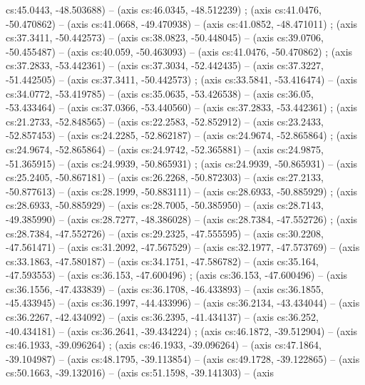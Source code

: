   cs:45.0443, -48.503688) -- (axis cs:46.0345, -48.512239)
  ;  (axis cs:41.0476, -50.470862) -- (axis
  cs:41.0668, -49.470938) -- (axis cs:41.0852, -48.471011)
  ;  (axis cs:37.3411, -50.442573) -- (axis
  cs:38.0823, -50.448045) -- (axis cs:39.0706, -50.455487) -- (axis cs:40.059,
  -50.463093) -- (axis cs:41.0476, -50.470862) ; 
  (axis cs:37.2833, -53.442361) -- (axis cs:37.3034, -52.442435) -- (axis
  cs:37.3227, -51.442505) -- (axis cs:37.3411, -50.442573)
  ;  (axis cs:33.5841, -53.416474) -- (axis
  cs:34.0772, -53.419785) -- (axis cs:35.0635, -53.426538) -- (axis cs:36.05,
  -53.433464) -- (axis cs:37.0366, -53.440560) -- (axis cs:37.2833,
  -53.442361) ;  (axis cs:21.2733, -52.848565) --
  (axis cs:22.2583, -52.852912) -- (axis cs:23.2433, -52.857453) -- (axis
  cs:24.2285, -52.862187) -- (axis cs:24.9674, -52.865864)
  ;  (axis cs:24.9674, -52.865864) -- (axis
  cs:24.9742, -52.365881) -- (axis cs:24.9875, -51.365915) -- (axis
  cs:24.9939, -50.865931) ;  (axis cs:24.9939,
  -50.865931) -- (axis cs:25.2405, -50.867181) -- (axis cs:26.2268,
  -50.872303) -- (axis cs:27.2133, -50.877613) -- (axis cs:28.1999,
  -50.883111) -- (axis cs:28.6933, -50.885929) ; 
  (axis cs:28.6933, -50.885929) -- (axis cs:28.7005, -50.385950) -- (axis
  cs:28.7143, -49.385990) -- (axis cs:28.7277, -48.386028) -- (axis
  cs:28.7384, -47.552726) ;  (axis cs:28.7384,
  -47.552726) -- (axis cs:29.2325, -47.555595) -- (axis cs:30.2208,
  -47.561471) -- (axis cs:31.2092, -47.567529) -- (axis cs:32.1977,
  -47.573769) -- (axis cs:33.1863, -47.580187) -- (axis cs:34.1751,
  -47.586782) -- (axis cs:35.164, -47.593553) -- (axis cs:36.153, -47.600496)
  ;  (axis cs:36.153, -47.600496) -- (axis
  cs:36.1556, -47.433839) -- (axis cs:36.1708, -46.433893) -- (axis
  cs:36.1855, -45.433945) -- (axis cs:36.1997, -44.433996) -- (axis
  cs:36.2134, -43.434044) -- (axis cs:36.2267, -42.434092) -- (axis
  cs:36.2395, -41.434137) -- (axis cs:36.252, -40.434181) -- (axis cs:36.2641,
  -39.434224) ;  (axis cs:46.1872, -39.512904) --
  (axis cs:46.1933, -39.096264) ;  (axis
  cs:46.1933, -39.096264) -- (axis cs:47.1864, -39.104987) -- (axis
  cs:48.1795, -39.113854) -- (axis cs:49.1728, -39.122865) -- (axis
  cs:50.1663, -39.132016) -- (axis cs:51.1598, -39.141303) -- (axis
